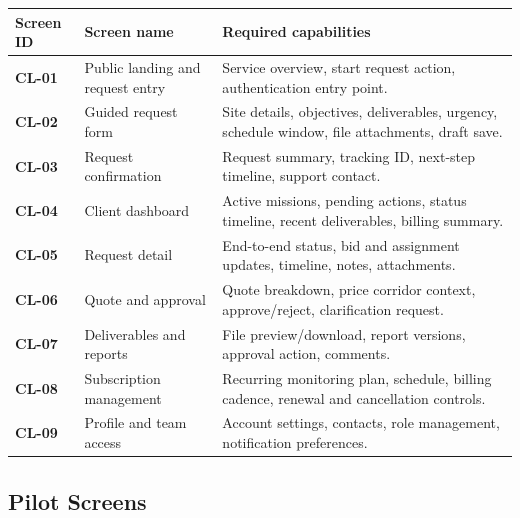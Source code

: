 \documentclass[11pt,a4paper]{article}
\begin{document}
\begin{longtable}{>{\bfseries}p{}p{}p{}}
\toprule
Screen ID & Screen name & Required capabilities \\
\midrule
CL-01 & Public landing and request entry & Service overview, start request action, authentication entry point. \\
CL-02 & Guided request form & Site details, objectives, deliverables, urgency, schedule window, file attachments, draft save. \\
CL-03 & Request confirmation & Request summary, tracking ID, next-step timeline, support contact. \\
CL-04 & Client dashboard & Active missions, pending actions, status timeline, recent deliverables, billing summary. \\
CL-05 & Request detail & End-to-end status, bid and assignment updates, timeline, notes, attachments. \\
CL-06 & Quote and approval & Quote breakdown, price corridor context, approve/reject, clarification request. \\
CL-07 & Deliverables and reports & File preview/download, report versions, approval action, comments. \\
CL-08 & Subscription management & Recurring monitoring plan, schedule, billing cadence, renewal and cancellation controls. \\
CL-09 & Profile and team access & Account settings, contacts, role management, notification preferences. \\
\bottomrule
\end{longtable}

\subsection{Pilot Screens}
\end{document}
